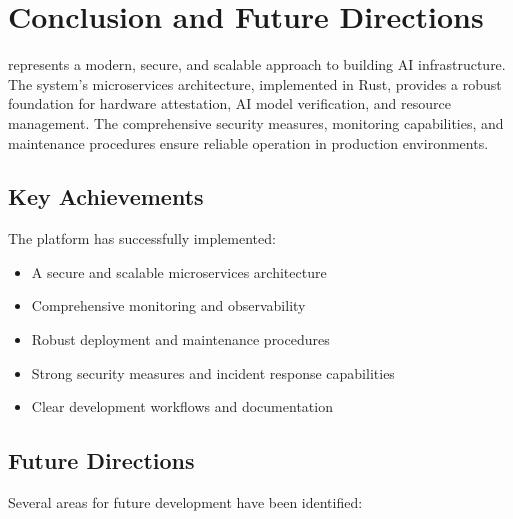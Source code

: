 \section{Conclusion and Future Directions}

\sysname{} represents a modern, secure, and scalable approach to building AI infrastructure. The system's microservices architecture, implemented in Rust, provides a robust foundation for hardware attestation, AI model verification, and resource management. The comprehensive security measures, monitoring capabilities, and maintenance procedures ensure reliable operation in production environments.

\subsection{Key Achievements}

The platform has successfully implemented:

\begin{itemize}
    \item A secure and scalable microservices architecture
    \item Comprehensive monitoring and observability
    \item Robust deployment and maintenance procedures
    \item Strong security measures and incident response capabilities
    \item Clear development workflows and documentation
\end{itemize}

\subsection{Future Directions}

Several areas for future development have been identified:

